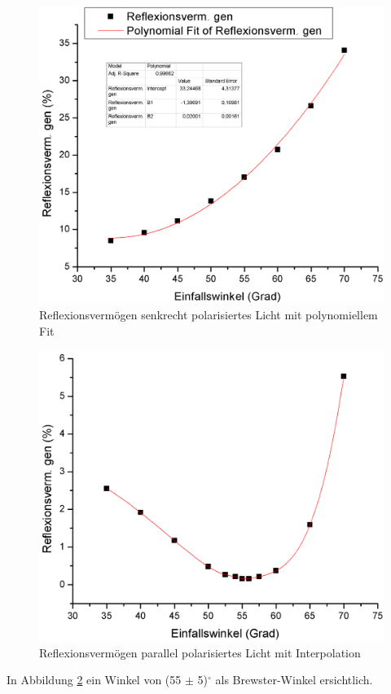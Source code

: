 \documentclass[12pt,a4paper]{article}
\begin{document}
\begin{multicols}{2}
\begin{figure}[H]
	\centering
	\includegraphics[scale=0.28]{./data/R_S_Plot.png}
	\caption{Reflexionsvermögen senkrecht polarisiertes Licht mit polynomiellem Fit}
	\label{fig:r_s_plot}
\end{figure}

\begin{figure}[H]
	\centering
	\includegraphics[scale=0.28]{./data/R_P_Plot.png}
	\caption{Reflexionsvermögen parallel polarisiertes Licht mit Interpolation}
	\label{fig:r_p_plot}
\end{figure}
In Abbildung \ref{fig:r_p_plot} ein Winkel von (55 $\pm$ 5)$^\circ$ als Brewster-Winkel ersichtlich.





\end{multicols}
\end{document}
